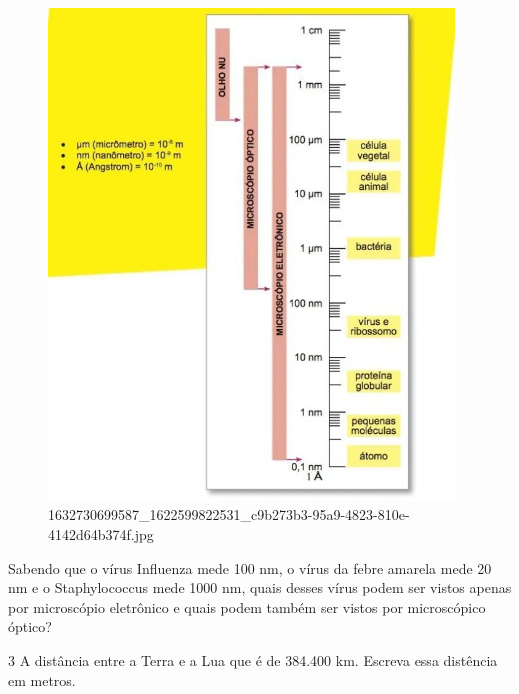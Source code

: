 \begin{escolha}
\begin{escolha}
\begin{escolha}
\begin{escolha}
{\begin{boxmedio}
\begin{boxpeq}
\begin{q°}
\begin{boxmedio}
\begin{boxpeq}
\begin{boxpeq}
\begin{boxmedio}
\begin{boxmedio}
\begin{boxmedio}
\begin{largebox}
\begin{boxmedio}
{\begin{enumerate}
\begin{boxpeq}
{\begin{figure}
\centering
\includegraphics[width=4.24063in,height=5.13386in]{./_SAEB_9_MAT/media/image230.jpg}
\caption{1632730699587\_1622599822531\_c9b273b3-95a9-4823-810e-4142d64b374f.jpg}
\end{figure}


Sabendo que o vírus Influenza mede 100 nm, o vírus da febre amarela mede 20 nm e
o Staphylococcus mede 1000 nm, quais desses vírus podem ser vistos apenas por 
microscópio eletrônico e quais podem também ser vistos por microscópico óptico?

\begin{boxpeq}

\num{3} A distância entre a Terra e a Lua que é de 384.400 km. Escreva essa distência
em metros.

\begin{boxpeq}


\end{boxpeq}
\end{boxpeq}}
\end{boxpeq}
\end{enumerate}}
\end{boxmedio}
\end{largebox}
\end{boxmedio}
\end{boxmedio}
\end{boxmedio}
\end{boxpeq}
\end{boxpeq}
\end{boxmedio}
\end{q°}
\end{boxpeq}
\end{boxmedio}}
\end{escolha}
\end{escolha}
\end{escolha}
\end{escolha}
